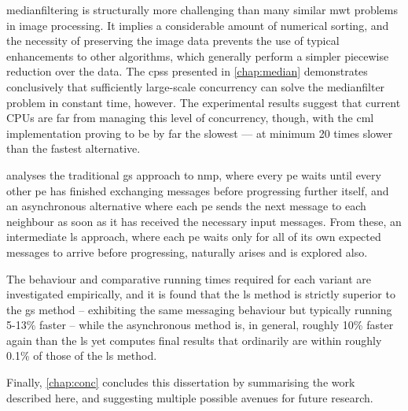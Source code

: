 \Gls{medianfilter}ing is structurally more challenging than many similar \gls{mwt} problems in image processing.  It implies a considerable amount of numerical sorting, and the necessity of preserving the image data prevents the use of typical enhancements to other algorithms, which generally perform a simpler piecewise reduction over the data.  The \glspl{cps} presented in \cref{chap:median} demonstrates conclusively that sufficiently large-scale concurrency can solve the \gls{medianfilter} problem in constant time, however.  The experimental results suggest that current CPUs are far from managing this level of concurrency, though, with the \gls{cml} implementation proving to be by far the slowest --- at minimum 20 times slower than the fastest alternative.

 analyses the traditional \gls{gs} approach to \gls{nmp}, where every \gls{pe} waits until every other \gls{pe} has finished exchanging messages before progressing further itself, and an asynchronous alternative where each \gls{pe} sends the next message to each neighbour as soon as it has received the necessary input messages.  From these, an intermediate \gls{ls} approach, where each \gls{pe} waits only for all of its own expected messages to arrive before progressing, naturally arises and is explored also.

The behaviour and comparative running times required for each variant are investigated empirically, and it is found that the \gls{ls} method is strictly superior to the \gls{gs} method -- exhibiting the same messaging behaviour but typically running 5-13\% faster -- while the asynchronous method is, in general, roughly 10\% faster again than the \gls{ls} yet computes final results that ordinarily are within roughly 0.1\% of those of the \gls{ls} method.

Finally, \cref{chap:conc} concludes this dissertation by summarising the work described here, and suggesting multiple possible avenues for future research.